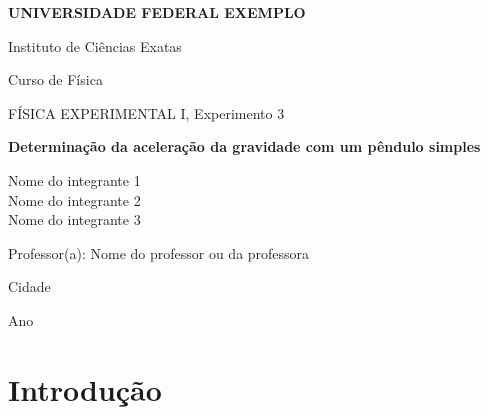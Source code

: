 \documentclass[12pt,a4paper]{report}
\newif\ifinstrucoes
\newcommand{\instrucao}[1]{\ifinstrucoes{\color{gray}\small\itshape #1\par}\fi}
\newcommand{\universidade}{Universidade Federal Exemplo}
\newcommand{\unidade}{Instituto de Ciências Exatas}
\newcommand{\curso}{Curso de Física}
\newcommand{\disciplina}{Física Experimental I}
\newcommand{\experimento}{Experimento 3}
\newcommand{\titulo}{Determinação da aceleração da gravidade com um pêndulo simples}
\newcommand{\integrantes}{Nome do integrante 1\\ Nome do integrante 2\\ Nome do integrante 3}
\newcommand{\professor}{Nome do professor ou da professora}
\newcommand{\local}{Cidade}
\newcommand{\data}{Ano}
\begin{document}
\begin{titlepage}
  \centering
  {\large\bfseries\MakeUppercase{\universidade}\par}
  \vspace{2pt}
  {\unidade\par\curso\par}
  \vspace{4cm}
  {\small\MakeUppercase{\disciplina}, \experimento\par}
  \vspace{1em}
  {\LARGE\bfseries\titulo\par}
  \vspace{3cm}
  {\large\integrantes\par}
  \vfill
  {Professor(a): \professor\par}
  \vspace{2cm}
  {\local\par\data\par}
\end{titlepage}

\begin{abstract}
  \instrucao{Em um só parágrafo de 100 a 250 palavras: objetivo, método, principal resultado com a incerteza e a conclusão. Escreva por último.}
  Este relatório descreve a determinação da aceleração da gravidade local a partir do período de um pêndulo simples. O período foi medido para seis comprimentos do fio, e a relação linear entre o quadrado do período e o comprimento foi ajustada pelo método dos mínimos quadrados ponderados. O coeficiente angular da reta fornece $g = \qty[round-mode=uncertainty]{\gravidade \pm \incertezaGravidade}{\metre\per\second\squared}$, compatível com o valor de referência dentro da incerteza.

  \medskip
  \noindent\textbf{Palavras-chave:} pêndulo simples. Aceleração da gravidade. Propagação de incertezas.
\end{abstract}

\tableofcontents

\section{Introdução}
\instrucao{Situe o experimento: qual grandeza se quer medir, por que ela importa e qual é o objetivo do trabalho. Feche com uma frase que diga o que o relatório apresenta.}
\end{document}
